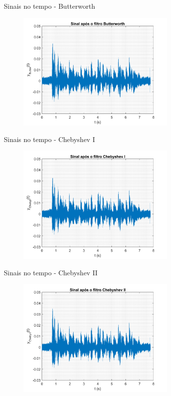 \begin{frame}{Sinais no tempo - Butterworth}
    \begin{figure}
        \centering
        \includegraphics[width=0.7\textwidth]{graficos/filtrados_t_b.png}
    \end{figure}
\end{frame}
\begin{frame}{Sinais no tempo - Chebyshev I}
    \begin{figure}
        \centering
        \includegraphics[width=0.7\textwidth]{graficos/filtrados_t_c1.png}
    \end{figure}
\end{frame}
\begin{frame}{Sinais no tempo - Chebyshev II}
    \begin{figure}
        \centering
        \includegraphics[width=0.7\textwidth]{graficos/filtrados_t_c2.png}
    \end{figure}
\end{frame}
